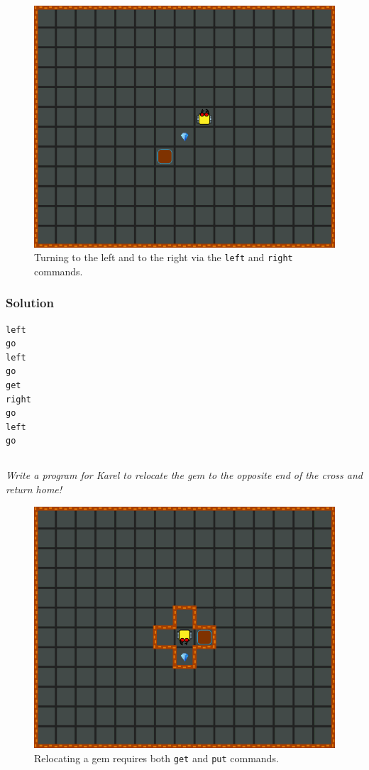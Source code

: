 \documentclass[article,A4,12pt]{llncs}
\begin{document}
{{\begin{figure}[!ht]
\begin{center}
\includegraphics[height=0.4\textwidth]{imgk/b03.png}
\end{center}
\vspace{-4mm}
\caption{Turning to the left and to the right via the {\tt left} and {\tt right} commands.}
\label{fig:b03}
\vspace{-4mm}
\end{figure}
\noindent

\subsubsection{Solution}
\begin{verbatim}
left
go
left
go
get
right
go
left
go
\end{verbatim}

\newpage
\subsection{}

{\em Write a program for Karel to relocate the gem to the opposite 
end of the cross and return home!}



\begin{figure}[!ht]
\begin{center}
\includegraphics[height=0.4\textwidth]{imgk/b04.png}
\end{center}
\vspace{-4mm}
\caption{Relocating a gem requires both {\tt get} and {\tt put} commands.}
\label{fig:b04}
\vspace{-4mm}
\end{figure}
\noindent

}}
\end{document}
